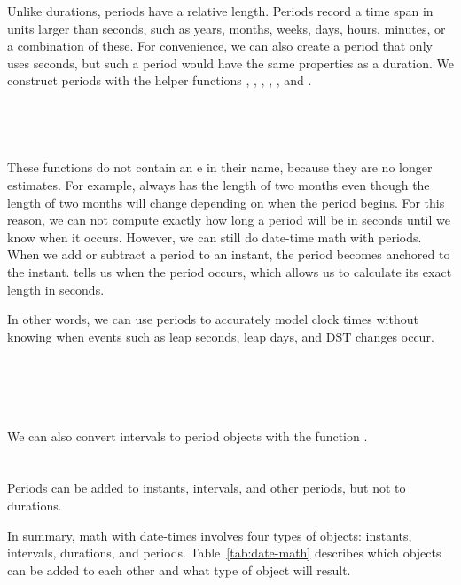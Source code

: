 \documentclass[article]{jss}
\begin{document}
Unlike durations, periods have a relative length. Periods record a time span in units larger than seconds, such as years, months, weeks, days, hours, minutes, or a combination of these. For convenience, we can also create a period that only uses seconds, but such a period would have the same properties as a duration. We construct periods with the helper functions , , , , , and  .\\

\\
\\

\\
\\

These functions do not contain an e in their name, because they are no longer estimates. For example,  always has the length of two months even though the length of two months will change depending on when the period begins. For this reason, we can not compute exactly how long a period will be in seconds until we know when it occurs. However, we can still do date-time math with periods. When we add or subtract a period to an instant, the period becomes anchored to the instant. tells us when the period occurs, which allows us to calculate its exact length in seconds. 

In other words, we can use periods to accurately model clock times without knowing when events such as leap seconds, leap days, and DST changes occur.

\\
\\

\\
\\

We can also convert intervals to period objects with the function .\\

\\
\\

Periods can be added to instants, intervals, and other periods, but not to durations.


In summary, math with date-times involves four types of objects: instants, intervals, durations, and periods. Table~\ref{tab:date-math} describes which objects can be added to each other and what type of object will result.
\end{document}
